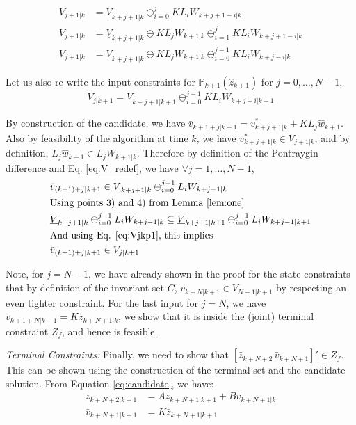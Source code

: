 \begin{subequations}
\label{eq:V_redef}
\begin{align}
V_{j+1|k}&=\underline{V}_{k+j+1|k} \ominus_{i=0}^{j} KL_iW_{k+j+1-i|k} \\
V_{j+1|k}&=\underline{V}_{k+j+1|k} \ominus KL_jW_{k+1|k} \ominus_{i=1}^{j} KL_iW_{k+j+1-i|k} \\
V_{j+1|k}&=\underline{V}_{k+j+1|k} \ominus KL_jW_{k+1|k} \ominus_{i=0}^{j-1} KL_iW_{k+j-i|k}
\end{align}
\end{subequations}

Let us also re-write the input constraints for $\mathbb{P}_{k+1}(\hat{z}_{k+1})$ for $j=0,\dotsc,N-1$,
\begin{equation}
\label{eq:Vjkp1}
V_{j|k+1}=\underline{V}_{k+j+1|k+1} \ominus_{i=0}^{j-1} KL_iW_{k+j-i|k+1}
\end{equation}

By construction of the candidate, we have $\bar{v}_{k+1+j|k+1}=v^{*}_{k+j+1|k}+KL_j\hat{w}_{k+1}$. Also by feasibility of the algorithm at time $k$, we have $v^{*}_{k+j+1|k} \in V_{j+1|k}$, and by definition, $L_j\hat{w}_{k+1} \in L_jW_{k+1|k}$. Therefore by definition of the Pontraygin difference and Eq. \ref{eq:V_redef}, we have $\forall j=1,\dotsc,N-1$,
\begin{subequations}
\begin{align}
&\bar{v}_{(k+1)+j|k+1} \in \underline{V}_{k+j+1|k} \ominus_{i=0}^{j-1}L_iW_{k+j-1|k} \\
&\text{Using points 3) and 4) from Lemma \ref{lem:one}} \nonumber \\
&\underline{V}_{k+j+1|k} \ominus_{i=0}^{j-1}L_iW_{k+j-1|k} \subseteq \underline{V}_{k+j+1|k+1} \ominus_{i=0}^{j-1}L_iW_{k+j-1|k+1} \\
&\text{And using Eq. \ref{eq:Vjkp1}, this implies} \nonumber \\
&\bar{v}_{(k+1)+j|k+1} \in V_{j|k+1}
\end{align}
\end{subequations}

Note,  for $j=N-1$, we have already shown in the proof for the state constraints that by definition of the invariant set $C$, $v_{k+N|k+1} \in {V}_{N-1|k+1}$ by respecting an even tighter constraint.
For the last input for $j=N$, we have $\bar{v}_{k+1+N|k+1}=K\bar{z}_{k+N+1|k}$, we show that it is inside the (joint) terminal constraint $Z_f$, and hence is feasible.

\textit{Terminal Constraints:} Finally, we need to show that $[\bar{z}_{k+N+2} \, \bar{v}_{k+N+1}]' \in Z_f$. This can be shown using the construction of the terminal set and the candidate solution. From Equation \ref{eq:candidate}, we have:
\begin{subequations}
\begin{align}
\bar{z}_{k+N+2|k+1}&=A\bar{z}_{k+N+1|k+1} + B\bar{v}_{k+N+1|k} \\
\bar{v}_{k+N+1|k+1}&=K\bar{z}_{k+N+1|k+1}
\end{align}
\end{subequations}

